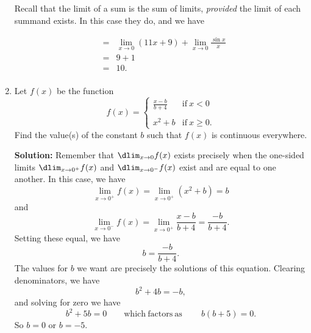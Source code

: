 \documentclass{article}
\begin{document}
\begin{enumerate}
Recall that the limit of a sum is the sum of limits, \emph{provided} the limit of each summand exists. In this case they do, and we have

\begin{eqnarray*}
 & = & \lim_{x \rightarrow 0} \left( 11 x + 9 \right) + \lim_{x \rightarrow 0} \frac{\sin x}{x} \\
 & = & 9 + 1 \\
 & = & 10. \\
\end{eqnarray*}


  
\vspace{1cm}

\item Let $f(x)$ be the function \[ f(x) = \left\{ \begin{array}{ll} \frac{x-b}{b + 4} & \mathrm{if}\ x < 0 \\ & \\ x^2 + b & \mathrm{if}\ x \geq 0. \end{array}\right. \] Find the value(s) of the constant $b$ such that $f(x)$ is continuous everywhere.

\textbf{Solution:} Remember that $\dlim_{x \rightarrow 0} f(x)$ exists precisely when the one-sided limits $\dlim_{x \rightarrow 0^+} f(x)$ and $\dlim_{x \rightarrow 0^-} f(x)$ exist and are equal to one another. In this case, we have \[ \lim_{x \rightarrow 0^+} f(x) = \lim_{x \rightarrow 0^+} (x^2 + b) = b \] and \[ \lim_{x \rightarrow 0^-} f(x) = \lim_{x \rightarrow 0^+} \frac{x-b}{b + 4} = \frac{-b}{b + 4}. \]
Setting these equal, we have \[ b = \frac{-b}{b + 4}. \]
The values for $b$ we want are precisely the solutions of this equation.
Clearing denominators, we have \[ b^2 + 4 b = -b, \] and solving for zero we have \[ b^2 + 5b = 0 \quad\quad \mathrm{which\ factors\ as}\ \quad\quad b (b + 5) = 0. \]
So $b = 0$ or $b = -5$.

  
\vspace{1cm}
\end{enumerate}
\end{document}
